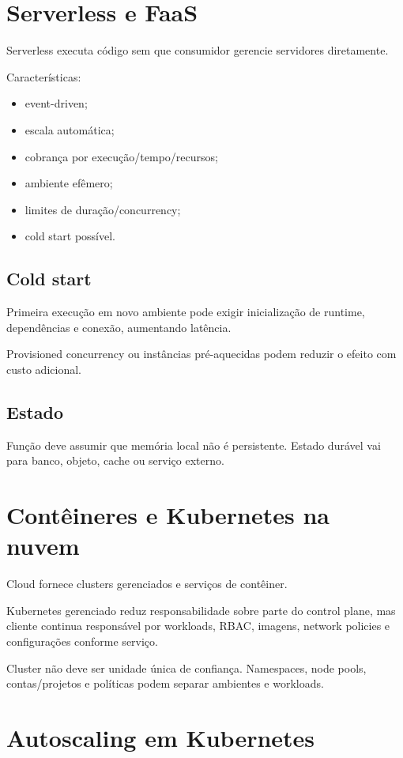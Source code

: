\section{Serverless e FaaS}

Serverless executa código sem que consumidor gerencie servidores diretamente.

Características:
\begin{itemize}
\item event-driven;
\item escala automática;
\item cobrança por execução/tempo/recursos;
\item ambiente efêmero;
\item limites de duração/concurrency;
\item cold start possível.
\end{itemize}

\subsection{Cold start}

Primeira execução em novo ambiente pode exigir inicialização de runtime, dependências e conexão, aumentando latência.

Provisioned concurrency ou instâncias pré-aquecidas podem reduzir o efeito com custo adicional.

\subsection{Estado}

Função deve assumir que memória local não é persistente. Estado durável vai para banco, objeto, cache ou serviço externo.

\section{Contêineres e Kubernetes na nuvem}

Cloud fornece clusters gerenciados e serviços de contêiner.

Kubernetes gerenciado reduz responsabilidade sobre parte do control plane, mas cliente continua responsável por workloads, RBAC, imagens, network policies e configurações conforme serviço.

Cluster não deve ser unidade única de confiança. Namespaces, node pools, contas/projetos e políticas podem separar ambientes e workloads.

\section{Autoscaling em Kubernetes}

